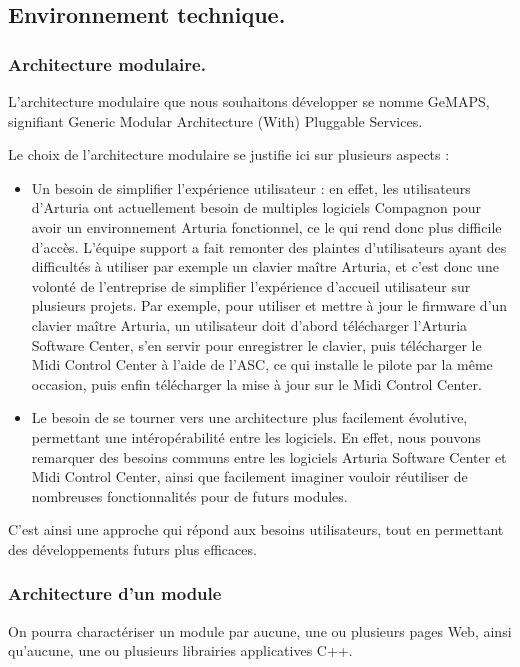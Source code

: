 \documentclass[francais]{rapportPFE}  %
\begin{document}
\subsection{Environnement technique.}

\subsubsection{Architecture modulaire.}
L'architecture modulaire que nous souhaitons développer se nomme GeMAPS, signifiant Generic Modular Architecture (With) Pluggable Services. 

Le choix de l'architecture modulaire se justifie ici sur plusieurs aspects : 
\begin{itemize}
    \item Un besoin de simplifier l'expérience utilisateur : en effet, les utilisateurs d'Arturia ont actuellement besoin de multiples logiciels Compagnon pour avoir un environnement Arturia fonctionnel, ce le qui rend donc plus difficile d'accès. L'équipe support a fait remonter des plaintes d'utilisateurs ayant des difficultés à utiliser par exemple un clavier maître Arturia, et c'est donc une volonté de l'entreprise de simplifier l'expérience d'accueil utilisateur sur plusieurs projets. Par exemple, pour utiliser et mettre à jour le firmware d'un clavier maître Arturia, un utilisateur doit d'abord télécharger l'Arturia Software Center, s'en servir pour enregistrer le clavier, puis télécharger le Midi Control Center à l'aide de l'ASC, ce qui installe le pilote par la même occasion, puis enfin télécharger la mise à jour sur le Midi Control Center.
    \item Le besoin de se tourner vers une architecture plus facilement évolutive, permettant une intéropérabilité entre les logiciels. En effet, nous pouvons remarquer des besoins communs entre les logiciels Arturia Software Center et Midi Control Center, ainsi que facilement imaginer vouloir réutiliser de nombreuses fonctionnalités pour de futurs modules.
\end{itemize}
C'est ainsi une approche qui répond aux besoins utilisateurs, tout en permettant des développements futurs plus efficaces.

\subsubsection{Architecture d'un module}

On pourra charactériser un module par aucune, une ou plusieurs pages Web, ainsi qu'aucune, une ou plusieurs librairies applicatives C++.
\end{document}

